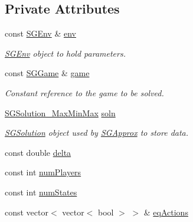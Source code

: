 \subsection*{Private Attributes}
\begin{DoxyCompactItemize}
\item 
\mbox{\label{classSGSolver__MaxMinMax__3Player_aad11d28ad224fb2fa1b245ea1a87a832}} 
const \hyperlink{classSGEnv}{S\+G\+Env} \& \hyperlink{classSGSolver__MaxMinMax__3Player_aad11d28ad224fb2fa1b245ea1a87a832}{env}
\begin{DoxyCompactList}\small\item\em \hyperlink{classSGEnv}{S\+G\+Env} object to hold parameters. \end{DoxyCompactList}\item 
\mbox{\label{classSGSolver__MaxMinMax__3Player_a398d79e97cad54e73da270bce81a2ed4}} 
const \hyperlink{classSGGame}{S\+G\+Game} \& \hyperlink{classSGSolver__MaxMinMax__3Player_a398d79e97cad54e73da270bce81a2ed4}{game}
\begin{DoxyCompactList}\small\item\em Constant reference to the game to be solved. \end{DoxyCompactList}\item 
\mbox{\label{classSGSolver__MaxMinMax__3Player_aa563ca5fbe38d9c22b072bfaebbe16ed}} 
\hyperlink{classSGSolution__MaxMinMax}{S\+G\+Solution\+\_\+\+Max\+Min\+Max} \hyperlink{classSGSolver__MaxMinMax__3Player_aa563ca5fbe38d9c22b072bfaebbe16ed}{soln}
\begin{DoxyCompactList}\small\item\em \hyperlink{classSGSolution}{S\+G\+Solution} object used by \hyperlink{classSGApprox}{S\+G\+Approx} to store data. \end{DoxyCompactList}\item 
const double \hyperlink{classSGSolver__MaxMinMax__3Player_ab29278f75dbc4201fbc6e61d70ea87d3}{delta}
\item 
const int \hyperlink{classSGSolver__MaxMinMax__3Player_ae77fe15fe7ea92f7e6b2e007627f7648}{num\+Players}
\item 
const int \hyperlink{classSGSolver__MaxMinMax__3Player_a6470be7219bd202efca50c2be4f7d84a}{num\+States}
\item 
const vector$<$ vector$<$ bool $>$ $>$ \& \hyperlink{classSGSolver__MaxMinMax__3Player_a3f7e306b8cff3023b0cee8cdc0a74c8b}{eq\+Actions}

\end{DoxyCompactItemize}
